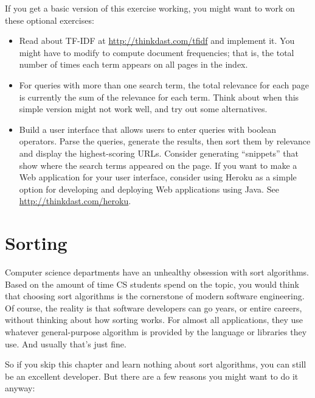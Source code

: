 \documentclass[12pt]{book}
\theoremstyle{exercise}
\begin{document}
If you get a basic version of this exercise working, you might want to work
on these optional exercises:

\begin{itemize}

\item Read about TF-IDF at \url{http://thinkdast.com/tfidf}
  and implement it. You might have to modify  to
  compute document frequencies; that is, the total number of times
  each term appears on all pages in the index.

\item For queries with more than one search term, the total relevance for
  each page is currently the sum of the relevance for each term. Think
  about when this simple version might not work well, and try out some
  alternatives.

\item Build a user interface that allows users to enter queries with
  boolean operators. Parse the queries, generate the results, then
  sort them by relevance and display the highest-scoring
  URLs. Consider generating ``snippets'' that show where the search
  terms appeared on the page. If you want to make a Web application
  for your user interface, consider using Heroku as a simple option
  for developing and deploying Web applications using Java.  See
  \url{http://thinkdast.com/heroku}.

\end{itemize}



\chapter{Sorting}

Computer science departments have an unhealthy obsession with sort
algorithms. Based on the amount of time CS students spend on the topic,
you would think that choosing sort algorithms is the cornerstone of
modern software engineering. Of course, the reality is that software
developers can go years, or entire careers, without thinking about how
sorting works. For almost all applications, they use whatever
general-purpose algorithm is provided by the language or libraries they
use. And usually that's just fine.


So if you skip this chapter and learn nothing about sort algorithms,
you can still be an excellent developer. But there are a few reasons
you might want to do it anyway:
\end{document}
